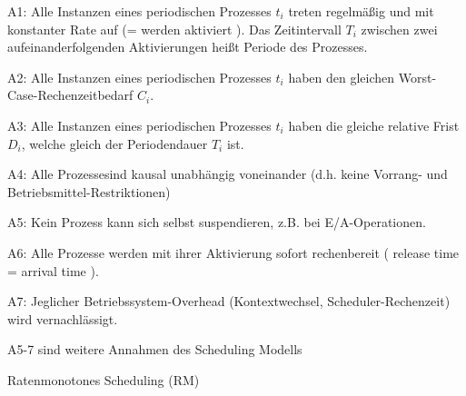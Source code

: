 \documentclass[a4paper]{article}
\begin{document}
\begin{multicols}{3}
    \begin{itemize*}
        \item
        A1: Alle Instanzen eines periodischen Prozesses $t_i$ treten
        regelmäßig und mit konstanter Rate auf (= werden aktiviert ). Das
        Zeitintervall $T_i$ zwischen zwei aufeinanderfolgenden
        Aktivierungen heißt Periode des Prozesses.
        \item
        A2: Alle Instanzen eines periodischen Prozesses $t_i$ haben den
        gleichen Worst-Case-Rechenzeitbedarf $C_i$.
        \item
        A3: Alle Instanzen eines periodischen Prozesses $t_i$ haben die
        gleiche relative Frist $D_i$, welche gleich der Periodendauer
        $T_i$ ist.
        \item
        A4: Alle Prozessesind kausal unabhängig voneinander (d.h. keine
        Vorrang- und Betriebsmittel-Restriktionen)
        \item
        A5: Kein Prozess kann sich selbst suspendieren, z.B. bei
        E/A-Operationen.
        \item
        A6: Alle Prozesse werden mit ihrer Aktivierung sofort rechenbereit (
        release time = arrival time ).
        \item
        A7: Jeglicher Betriebssystem-Overhead (Kontextwechsel,
        Scheduler-Rechenzeit) wird vernachlässigt.
    \end{itemize*}

    A5-7 sind weitere Annahmen des Scheduling Modells

    Ratenmonotones Scheduling (RM)


\end{multicols}
\end{document}
